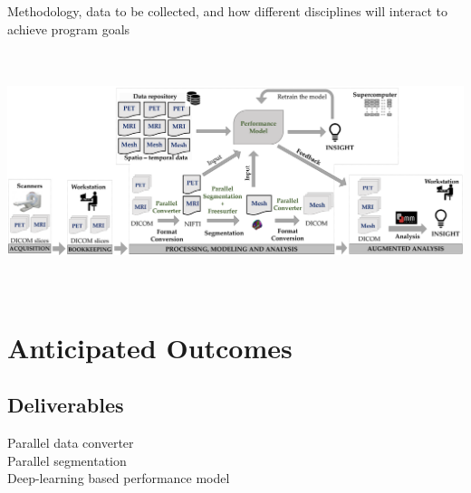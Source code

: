 \documentclass[11pt]{article}
\begin{document}
Methodology, data to be collected, and how different disciplines will interact to achieve program goals


\includegraphics[width=1\textwidth, height=7cm]{Proposed.pdf}\\

\section{Anticipated Outcomes}

\subsection{Deliverables}

Parallel data converter \\
Parallel segmentation \\
Deep-learning based performance model \\
\end{document}
